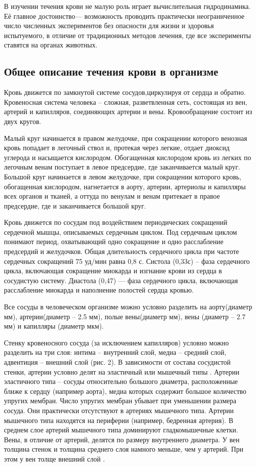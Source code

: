 В изучении течения крови не малую роль играет вычислительная гидродинамика. Её главное достоинство— возможность проводить практически неограниченное число численных экспериментов без опасности для жизни и здоровья испытуемого, в отличие от традиционных методов лечения, где все эксперименты ставятся на органах животных.

\subsection{Общее описание течения крови в организме}
Кровь движется по замкнутой системе сосудов,циркулируя от сердца и обратно. Кровеносная система человека -- сложная, разветвленная сеть, состоящая из вен, артерий и капилляров, соединяющих артерии и вены. Кровообращение состоит из двух кругов.

Малый круг начинается в правом желудочке, при сокращении которого венозная кровь попадает в легочный ствол и, протекая через легкие, отдает диоксид углерода и насыщается кислородом. Обогащенная кислородом кровь из легких по легочным венам поступает в левое предсердие, где заканчивается малый круг. Большой круг начинается в левом желудочке, при сокращении которого кровь, обогащенная кислородом, нагнетается в аорту, артерии, артериолы и капилляры всех органов и тканей, а оттуда по венулам и венам притекает в правое предсердие, где и заканчивается большой круг.

Кровь движется по сосудам под воздействием периодических сокращений сердечной мышцы, описываемых сердечным циклом. Под сердечным циклом понимают период, охватывающий одно сокращение и одно расслабление предсердий и желудочков. Общая длительность сердечного цикла при частоте сердечных сокращений 75 уд/мин равна 0,8 с. Систола (0,33с) -- фаза сердечного цикла, включающая сокращение миокарда и изгнание крови из сердца в сосудистую систему. Диастола (0,47) — фаза сердечного цикла, включающая расслабление миокарда и наполнение полостей сердца кровью.

Все сосуды в человеческом организме можно условно разделить на аорту(диаметр  мм), артерии(диаметр  -- 2.5 мм), полые вены(диаметр  мм), вены (диаметр  -- 2.7 мм) и капилляры (диаметр  мкм).

Стенку кровеносного сосуда (за исключением капилляров) условно можно разделить на три слоя: интима – внутренний слой, медиа – средний слой, адвентиция – внешний слой (рис. 2).
В зависимости от состава сосудистой стенки, артерии условно делят на эластичный или мышечный типы . Артерии эластичного типа – сосуды относительно большого диаметра, расположенные ближе к сердцу (например аорта), медиа которых содержит большое количество упругих мембран. Число упругих мембран убывает при уменьшении размера сосуда. Они практически отсутствуют в артериях мышечного типа. Артерии мышечного типа находятся на периферии (например, бедренная артерия). В среднем слое артерий мышечного типа доминируют гладкомышечные клетки. Вены, в отличие от артерий, делятся по размеру внутреннего диаметра. У вен толщина стенок и толщина среднего слоя намного меньше, чем у артерий. При этом у вен толще внешний слой \cite{Rhodin:1980}. 


